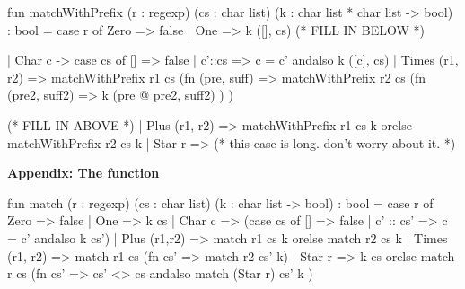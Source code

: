 \documentclass[addpoints,12pt]{exam}
\begin{document}
\begin{questions}
\begin{parts}
  \begin{codeblock}
    fun matchWithPrefix
          (r : regexp)
          (cs : char list)
          (k : char list * char list -> bool) : bool =
      case r of
        Zero => false
      | One => k ([], cs)
    (* FILL IN BELOW *)
  \end{codeblock}
  \begin{solutionorbox}[28em]
    \begin{codeblock}
       | Char c ->
            case cs of
              [] => false
            | c'::cs =>
                c = c' andalso k ([c], cs)
        | Times (r1, r2) =>
            matchWithPrefix r1 cs (fn (pre, suff) =>
              matchWithPrefix r2 cs (fn (pre2, suff2) =>
                k (pre @ pre2, suff2)
              )
            )
    \end{codeblock}
  \end{solutionorbox}
  \begin{codeblock}
    (* FILL IN ABOVE *)
      | Plus (r1, r2) =>
          matchWithPrefix r1 cs k orelse matchWithPrefix r2 cs k
      | Star r =>
          (* this case is long. don't worry about it. *)
  \end{codeblock}
\end{parts}

\newpage

\textbf{Appendix: The  function}

\vspace{10pt}

\begin{codeblock}
  fun match (r : regexp)
            (cs : char list)
            (k : char list -> bool) : bool =
    case r of
      Zero => false
    | One => k cs
    | Char c => (case cs of
        [] => false
      | c' :: cs' => c = c' andalso k cs')
    | Plus (r1,r2) => match r1 cs k orelse match r2 cs k
    | Times (r1, r2) => match r1 cs (fn cs' => match r2 cs' k)
    | Star r =>
        k cs orelse
        match r cs (fn cs' =>
          cs' <> cs andalso match (Star r) cs' k
        )
\end{codeblock}

\end{questions}
\end{document}
